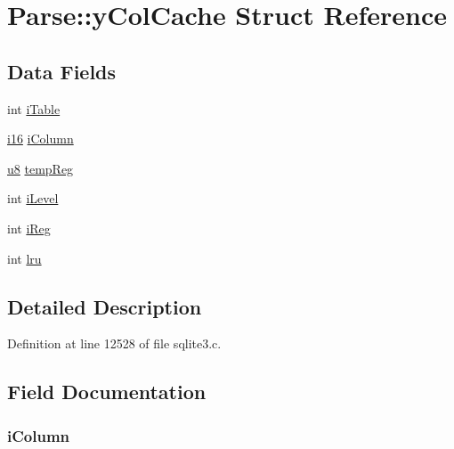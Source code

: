 \hypertarget{struct_parse_1_1y_col_cache}{}\section{Parse\+:\+:y\+Col\+Cache Struct Reference}
\label{struct_parse_1_1y_col_cache}
\subsection*{Data Fields}
\begin{DoxyCompactItemize}
\item 
int \hyperlink{struct_parse_1_1y_col_cache_a3d7171e8cbf2d9cc6743da9da42c8828}{i\+Table}
\item 
\hyperlink{sqlite3_8c_a7b32340f65cd15f029caad258fb3355c}{i16} \hyperlink{struct_parse_1_1y_col_cache_a836803480fdabe0da5857977f0a01ee8}{i\+Column}
\item 
\hyperlink{sqlite3_8c_a74a0f6424ae628af25f23f0a35f6ead3}{u8} \hyperlink{struct_parse_1_1y_col_cache_a47d171a466d6c6109db804959dc78d0d}{temp\+Reg}
\item 
int \hyperlink{struct_parse_1_1y_col_cache_ad73f24067e0eae67be577280724e2eef}{i\+Level}
\item 
int \hyperlink{struct_parse_1_1y_col_cache_a1be5902fe2740ac85b927b5a149ff4f9}{i\+Reg}
\item 
int \hyperlink{struct_parse_1_1y_col_cache_aaa512d67246ca02e20b70b653950cb71}{lru}
\end{DoxyCompactItemize}


\subsection{Detailed Description}


Definition at line 12528 of file sqlite3.\+c.



\subsection{Field Documentation}
\hypertarget{struct_parse_1_1y_col_cache_a836803480fdabe0da5857977f0a01ee8}{}
\subsubsection[{i\+Column}]{ i\+Column}\label{struct_parse_1_1y_col_cache_a836803480fdabe0da5857977f0a01ee8}


